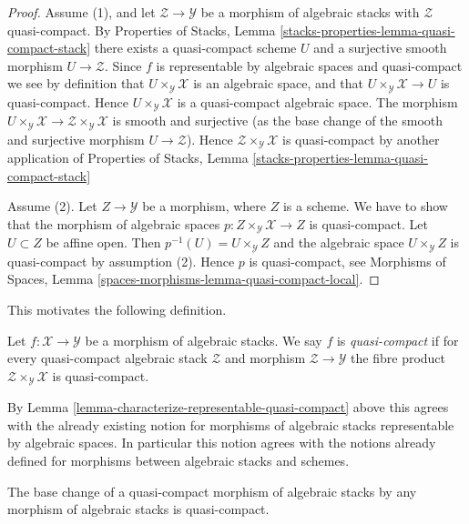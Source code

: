 \begin{proof}
Assume (1), and let $\mathcal{Z} \to \mathcal{Y}$
be a morphism of algebraic stacks with $\mathcal{Z}$ quasi-compact. By
Properties of Stacks,
Lemma \ref{stacks-properties-lemma-quasi-compact-stack}
there exists a quasi-compact scheme $U$ and a surjective smooth
morphism $U \to \mathcal{Z}$. Since $f$ is representable by algebraic
spaces and quasi-compact we see by definition that
$U \times_\mathcal{Y} \mathcal{X}$ is an algebraic space, and that
$U \times_\mathcal{Y} \mathcal{X} \to U$ is quasi-compact.
Hence $U \times_\mathcal{Y} \mathcal{X}$ is a quasi-compact algebraic space.
The morphism
$U \times_\mathcal{Y} \mathcal{X} \to
\mathcal{Z} \times_\mathcal{Y} \mathcal{X}$
is smooth and surjective (as the base change of the smooth
and surjective morphism $U \to \mathcal{Z}$).
Hence $\mathcal{Z} \times_\mathcal{Y} \mathcal{X}$
is quasi-compact by another application of
Properties of Stacks,
Lemma \ref{stacks-properties-lemma-quasi-compact-stack}

\medskip\noindent
Assume (2). Let $Z \to \mathcal{Y}$ be a morphism, where $Z$ is a scheme.
We have to show that the morphism of algebraic spaces
$p : Z \times_\mathcal{Y} \mathcal{X} \to Z$ is quasi-compact.
Let $U \subset Z$ be affine open. Then
$p^{-1}(U) = U \times_\mathcal{Y} Z$
and the algebraic space $U \times_\mathcal{Y} Z$
is quasi-compact by assumption (2). Hence $p$ is quasi-compact, see
Morphisms of Spaces, Lemma \ref{spaces-morphisms-lemma-quasi-compact-local}.
\end{proof}

\noindent
This motivates the following definition.

\begin{definition}
\label{definition-quasi-compact}
Let $f : \mathcal{X} \to \mathcal{Y}$ be a morphism of algebraic stacks.
We say $f$ is {\it quasi-compact} if for every quasi-compact
algebraic stack $\mathcal{Z}$ and morphism $\mathcal{Z} \to \mathcal{Y}$
the fibre product $\mathcal{Z} \times_\mathcal{Y} \mathcal{X}$
is quasi-compact.
\end{definition}

\noindent
By
Lemma \ref{lemma-characterize-representable-quasi-compact}
above this agrees with the already existing notion
for morphisms of algebraic stacks representable by algebraic spaces.
In particular this notion agrees with the notions already defined
for morphisms between algebraic stacks and schemes.

\begin{lemma}
\label{lemma-base-change-quasi-compact}
The base change of a quasi-compact morphism of algebraic stacks
by any morphism of algebraic stacks is quasi-compact.
\end{lemma}

